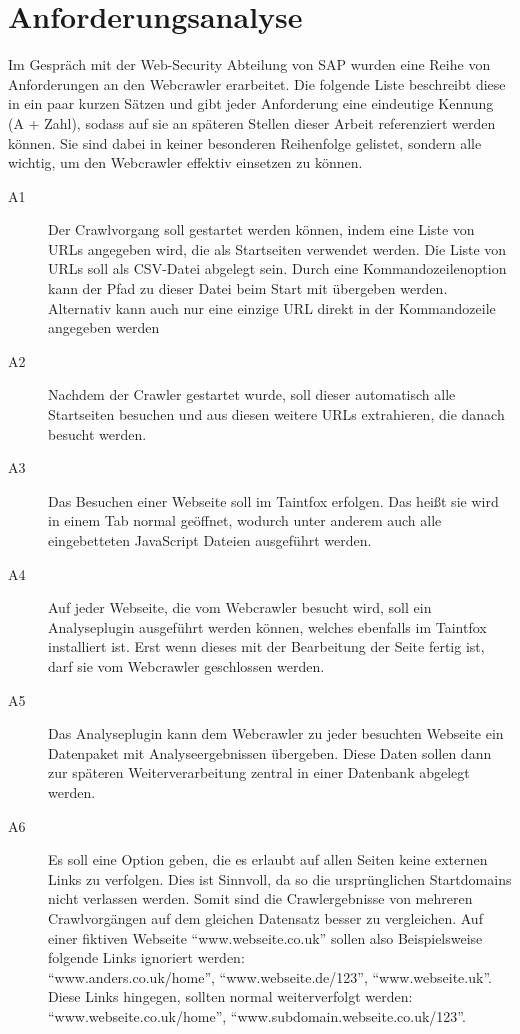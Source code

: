 \section{Anforderungsanalyse}
Im Gespräch mit der Web-Security Abteilung von SAP wurden eine Reihe von Anforderungen an den Webcrawler erarbeitet. Die folgende Liste beschreibt diese in ein paar kurzen Sätzen und gibt jeder Anforderung eine eindeutige Kennung (A + Zahl), sodass auf sie an späteren Stellen dieser Arbeit referenziert werden können. Sie sind dabei in keiner besonderen Reihenfolge gelistet, sondern alle wichtig, um den Webcrawler effektiv einsetzen zu können.
\begin{description}
	\item[ A1 ] Der Crawlvorgang soll gestartet werden können, indem eine Liste von URLs angegeben wird, die als Startseiten verwendet werden. Die Liste von URLs soll als CSV-Datei abgelegt sein. Durch eine Kommandozeilenoption kann der Pfad zu dieser Datei beim Start mit übergeben werden. Alternativ kann auch nur eine einzige URL direkt in der Kommandozeile angegeben werden
	\item[ A2 ] Nachdem der Crawler gestartet wurde, soll dieser automatisch alle Startseiten besuchen und aus diesen weitere URLs extrahieren, die danach besucht werden.
	\item[ A3 ] Das Besuchen einer Webseite soll im Taintfox erfolgen. Das heißt sie wird in einem Tab normal geöffnet, wodurch unter anderem auch alle eingebetteten JavaScript Dateien ausgeführt werden. 
	\item[ A4 ] Auf jeder Webseite, die vom Webcrawler besucht wird, soll ein Analyseplugin ausgeführt werden können, welches ebenfalls im Taintfox installiert ist. Erst wenn dieses mit der Bearbeitung der Seite fertig ist, darf sie vom Webcrawler geschlossen werden.
	\item[ A5 ] Das Analyseplugin kann dem Webcrawler zu jeder besuchten Webseite ein Datenpaket mit Analyseergebnissen übergeben. Diese Daten sollen dann zur späteren Weiterverarbeitung zentral in einer Datenbank abgelegt werden.
	\item[ A6 ] Es soll eine Option geben, die es erlaubt auf allen Seiten keine externen Links zu verfolgen. Dies ist Sinnvoll, da so die ursprünglichen Startdomains nicht verlassen werden. Somit sind die Crawlergebnisse von mehreren Crawlvorgängen auf dem gleichen Datensatz besser zu vergleichen. Auf einer fiktiven Webseite \enquote{www.webseite.co.uk} sollen also Beispielsweise folgende Links ignoriert werden: \\ \enquote{www.anders.co.uk/home}, \enquote{www.webseite.de/123}, \enquote{www.webseite.uk}. Diese Links hingegen, sollten normal weiterverfolgt werden: \\  \enquote{www.webseite.co.uk/home},  \enquote{www.subdomain.webseite.co.uk/123}. \\

\end{description}
